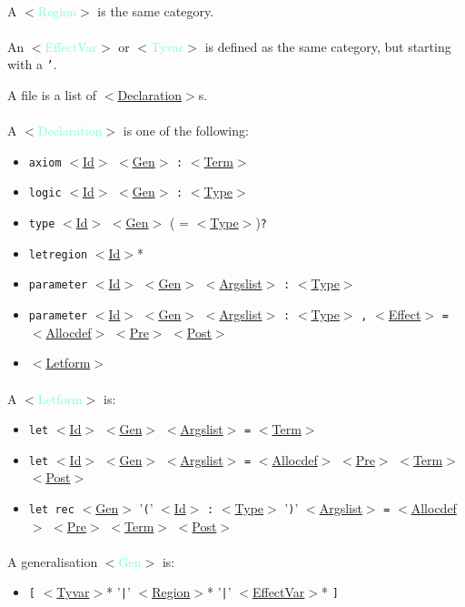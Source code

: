 \documentclass[a4paper]{scrreprt}
\newcommand{\cat}[1]{$<$\hyperref[#1]{#1}$>$}
\newcommand{\likecat}[1]{$<$\textcolor{Aquamarine}{#1}$>$}
\newcommand{\catdef}[1]{\label{#1}\likecat{#1}}
\begin{document}
\paragraph{}
A \catdef{Region} is the same category.

\paragraph{}
An \catdef{EffectVar} or \catdef{Tyvar} is defined as the same category, 
but starting with a {\tt '}.

A file is a list of \cat{Declaration}s.

\paragraph{}
A \catdef{Declaration} is one of the following: 
\begin{itemize}
  \item {\tt axiom} \cat{Id} \cat{Gen} {\tt :} \cat{Term}
  \item {\tt logic} \cat{Id} \cat{Gen} {\tt :} \cat{Type}
  \item {\tt type} \cat{Id} \cat{Gen}  ( = \cat{Type}){\tt ?}
  \item {\tt letregion} \cat{Id}*
  \item {\tt parameter} \cat{Id} \cat{Gen} \cat{Argslist} {\tt :} \cat{Type}
  \item {\tt parameter} \cat{Id} \cat{Gen} \cat{Argslist} {\tt :} \cat{Type}
    {\tt ,} \cat{Effect} {\tt =} \cat{Allocdef} {\cat{Pre}} {\cat{Post}}
  \item \cat{Letform}
\end{itemize}

\paragraph{}
A \catdef{Letform} is:
\begin{itemize}
  \item {\tt let} \cat{Id} \cat{Gen} \cat{Argslist} {\tt =} \cat{Term}
  \item {\tt let} \cat{Id} \cat{Gen} \cat{Argslist} {\tt =} \cat{Allocdef} {\cat{Pre}} \cat{Term} {\cat{Post}}
  \item {\tt let rec} \cat{Gen} '{\tt (}' \cat{Id} {\tt :} \cat{Type} '{\tt )}'
    \cat{Argslist} {\tt =} \cat{Allocdef} {\cat{Pre}} \cat{Term} {\cat{Post}}
\end{itemize}

\paragraph{}
A generalisation \catdef{Gen} is:
\begin{itemize}
  \item {\tt [} \cat{Tyvar}* '{\tt |}' \cat{Region}* '{\tt |}' \cat{EffectVar}*
    {\tt ]}
\end{itemize}
\end{document}
